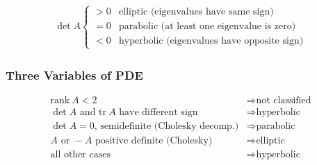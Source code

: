 \begin{align*}
    \det A
    \left\{
    \begin{matrix}
        >0 & \text{elliptic (eigenvalues have same sign)}       \\
        =0 & \text{parabolic (at least one eigenvalue is zero)} \\
        <0 & \text{hyperbolic (eigenvalues have opposite sign)}
    \end{matrix}
    \right.
\end{align*}

\subsubsection{Three Variables of PDE}

\begin{align*}
    \mathrm{rank}\ A < 2 & \Rightarrow \text{not classified} \\
    \det A\text{ and }\mathrm{tr}\ A\text{ have different sign} & \Rightarrow\text{hyperbolic} \\
    \det A=0\text{, semidefinite (Cholesky decomp.)} & \Rightarrow\text{parabolic} \\
    A\text{ or }-A\text{ positive definite (Cholesky)} & \Rightarrow\text{elliptic} \\
    \text{all other cases} & \Rightarrow\text{hyperbolic}
\end{align*}
